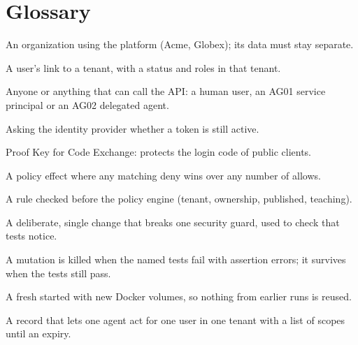 \section{Glossary}
\begin{description}[leftmargin=3.2cm, labelwidth=3.0cm, itemsep=1pt]
  \item[Tenant] An organization using the platform (Acme, Globex); its data must stay separate.
  \item[Membership] A user's link to a tenant, with a status and roles in that tenant.
  \item[Principal] Anyone or anything that can call the API: a human user, an AG01 service principal or an AG02 delegated agent.
  \item[Introspection] Asking the identity provider whether a token is still active.
  \item[PKCE] Proof Key for Code Exchange: protects the login code of public clients.
  \item[Deny-overrides] A policy effect where any matching deny wins over any number of allows.
  \item[Hard boundary] A rule checked before the policy engine (tenant, ownership, published, teaching).
  \item[Mutation] A deliberate, single change that breaks one security guard, used to check that tests notice.
  \item[Killed / survived] A mutation is killed when the named tests fail with assertion errors; it survives when the tests still pass.
  \item[Clean clone] A fresh  started with new Docker volumes, so nothing from earlier runs is reused.
  \item[Delegation] A record that lets one agent act for one user in one tenant with a list of scopes until an expiry.
\end{description}
